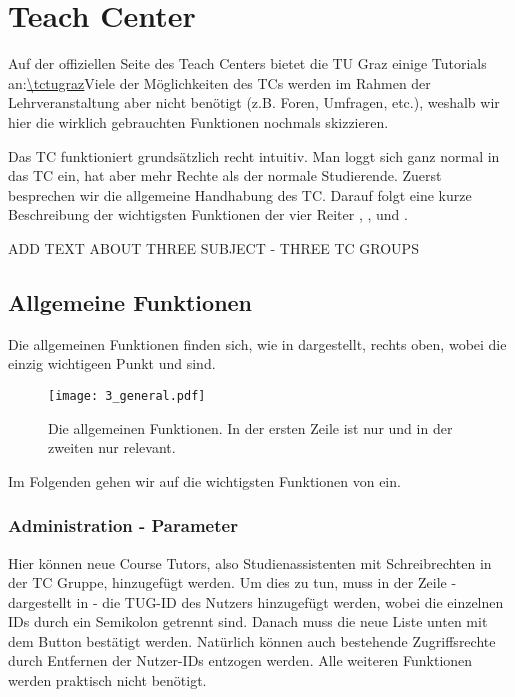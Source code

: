 \chapter{Teach Center}

Auf der offiziellen Seite des Teach Centers bietet die TU Graz einige Tutorials 
an:\linebreak\url{\tctugraz}\linebreak Viele der Möglichkeiten des TCs
werden im Rahmen der Lehrveranstaltung aber nicht benötigt (z.B. Foren,
Umfragen, etc.), weshalb wir hier die wirklich gebrauchten Funktionen nochmals 
skizzieren.

Das TC funktioniert grundsätzlich recht intuitiv. Man loggt sich ganz normal in
das TC ein, hat aber mehr Rechte als der normale Studierende. Zuerst besprechen
wir die allgemeine Handhabung des TC. Darauf folgt eine kurze Beschreibung der
wichtigsten Funktionen der vier Reiter ,
,  und .

ADD TEXT ABOUT THREE SUBJECT - THREE TC GROUPS

\section{Allgemeine Funktionen}

Die allgemeinen Funktionen finden sich, wie in  dargestellt,
rechts oben, wobei die einzig wichtigeen Punkt  und
 sind.

\begin{figure}[htbp]
\begin{center}
  \texttt{[image: 3\_general.pdf]}
  \caption{ Die allgemeinen Funktionen. In der ersten Zeile ist nur 
     und in der zweiten nur  relevant.}
  \label{fig:general}
\end{center}
\end{figure}

Im Folgenden gehen wir auf die wichtigsten Funktionen von
 ein.

\subsection{Administration - Parameter}

Hier können neue \glqq{}Course Tutors\grqq{}, also Studienassistenten mit
Schreibrechten in der TC Gruppe, hinzugefügt werden. Um dies zu tun, muss in
der Zeile  - dargestellt in  - 
die TUG-ID des Nutzers hinzugefügt werden, wobei die einzelnen IDs durch ein 
Semikolon getrennt sind. Danach muss die neue Liste unten mit dem Button 
 bestätigt werden. Natürlich können auch bestehende Zugriffsrechte 
durch Entfernen der Nutzer-IDs entzogen werden. Alle weiteren Funktionen werden 
praktisch nicht benötigt.

